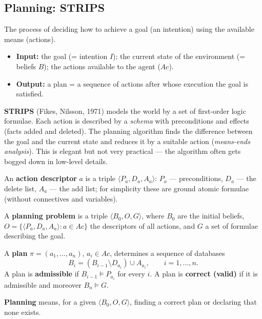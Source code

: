\documentclass[11pt,a4paper]{article}
\theoremstyle{definition}
\begin{document}
\subsection{Planning: STRIPS}

\begin{defbox}
The process of deciding how to achieve a goal (an intention) using the available means (actions).
\begin{itemize}
\item \textbf{Input:} the goal (= intention $I$); the current state of the environment
  (= beliefs $B$); the actions available to the agent ($\mathit{Ac}$).
\item \textbf{Output:} a plan = a sequence of actions after whose execution the goal is satisfied.
\end{itemize}
\end{defbox}

\textbf{STRIPS} (Fikes, Nilsson, 1971) models the world by a set of first-order logic formulae.
Each action is described by a \emph{schema} with preconditions and effects (facts added and
deleted). The planning algorithm finds the difference between the goal and the current state and
reduces it by a suitable action (\emph{means-ends analysis}). This is elegant but not very
practical --- the algorithm often gets bogged down in low-level details.

\begin{defbox}
An \textbf{action descriptor} $a$ is a triple $\langle P_a, D_a, A_a\rangle$:
$P_a$ --- preconditions, $D_a$ --- the delete list, $A_a$ --- the add list; for simplicity these
are ground atomic formulae (without connectives and variables).

A \textbf{planning problem} is a triple $\langle B_0, O, G\rangle$, where $B_0$ are the initial
beliefs, $O = \{\langle P_a,D_a,A_a\rangle : a \in \mathit{Ac}\}$ the descriptors of all actions,
and $G$ a set of formulae describing the goal.

A \textbf{plan} $\pi = (a_1,\dots,a_n)$, $a_i \in \mathit{Ac}$, determines a sequence of databases
\[
B_i = (B_{i-1} \setminus D_{a_i}) \cup A_{a_i}, \qquad i = 1,\dots,n .
\]
A plan is \textbf{admissible} if $B_{i-1} \models P_{a_i}$ for every $i$.
A plan is \textbf{correct (valid)} if it is admissible and moreover $B_n \models G$.

\textbf{Planning} means, for a given $\langle B_0,O,G\rangle$, finding a correct plan or declaring
that none exists.
\end{defbox}
\end{document}

